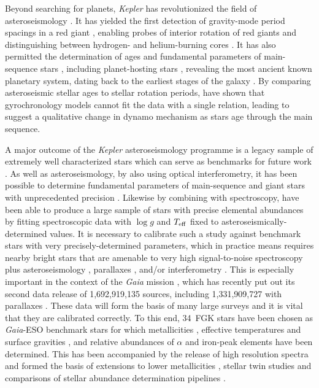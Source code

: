 \documentclass[a4paper,fleqn,usenatbib]{mnras}
\newcommand{\teff}{\mbox{$T_{\rm eff}$}\xspace}
\newcommand{\logg}{\mbox{$\log g$}\xspace}
\newcommand{\kepler}{\emph{Kepler}\xspace}
\newcommand{\gaia}{\emph{Gaia}\xspace}
\begin{document}
Beyond searching for planets, \kepler has revolutionized the field of asteroseismology \citep{2010PASP..122..131G}. It has yielded the first detection of gravity-mode period spacings in a red giant \citep{rggmodes}, enabling probes of interior rotation of red giants \citep{rggmoderotation} and distinguishing between hydrogen- and helium-burning cores \citep{rggmodehelium}. It has also permitted the determination of ages and fundamental parameters of main-sequence stars \citep{silvaages}, including planet-hosting stars \citep{huberplanetages,silvaplanetages,2018MNRAS.479.4786V}, revealing the most ancient known planetary system, dating back to the earliest stages of the galaxy \citep{ancientplanets}. By comparing asteroseismic stellar ages to stellar rotation periods, \citet{angusgyro} have shown that gyrochronology models cannot fit the data with a single relation, leading \citet{vansadersgyro} to suggest a qualitative change in dynamo mechanism as stars age through the main sequence. \newpage

A major outcome of the \kepler asteroseismology programme is a legacy sample of extremely well characterized stars which can serve as benchmarks for future work \citep{keplerlegacy1,keplerlegacy2}. As well as asteroseismology, by also using optical interferometry, it has been possible to determine fundamental parameters of main-sequence and giant stars with unprecedented precision \citep{huber12,thetacygwhite,white15}. Likewise by combining with spectroscopy, \citet{hawkinsapogee} have been able to produce a large sample of stars with precise elemental abundances by fitting spectroscopic data with \logg and \teff fixed to asteroseismically-determined values. It is necessary to calibrate such a study against benchmark stars with very precisely-determined parameters, which in practice means requires nearby bright stars that are amenable to very high signal-to-noise spectroscopy plus asteroseismology \citep{creeveybenchmark},  parallaxes \citep{hawkinsbenchmarks}, and/or interferometry \citep{casagrandebenchmark,creeveybenchmark2}. This is especially important in the context of the \gaia mission \citep{gaia}, which has recently put out its second data release of 1,692,919,135 sources, including 1,331,909,727 with parallaxes \citep{gaiadr2}. These data will form the basis of many large surveys and it is vital that they are calibrated correctly. To this end, 34~FGK stars have been chosen as \gaia-ESO benchmark stars for which metallicities \citep{gaiabenchmark1}, effective temperatures and surface gravities \citep{gaiabenchmark3}, and relative abundances of $\alpha$ and iron-peak elements \citep{gaiabenchmark4} have been determined. This has been accompanied by the release of high resolution spectra \citep{gaiabenchmark2} and formed the basis of extensions to lower metallicities \citep{gaiabenchmark5}, stellar twin studies \citep{gaiabenchmarktwins} and comparisons of stellar abundance determination pipelines \citep{gaiabenchmarkabundances}. 
\end{document}
